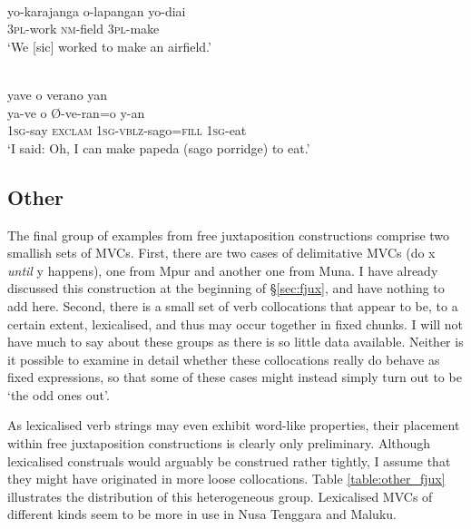 \ea \label{Tobelo_16}
\\
\gll yo-karajanga o-lapangan yo-diai \\
3\textsc{pl}-work \textsc{nm}-field 3\textsc{pl}-make \\
\glft `We [sic] worked to make an airfield.' \\ 
\z

\ea \label{Dusner_4}
\\
\glll yave o verano yan \\
ya-ve o Ø-ve-ran=o y-an \\
1\textsc{sg}-say \textsc{exclam} 1\textsc{sg}-\textsc{vblz}-sago=\textsc{fill} 1\textsc{sg}-eat \\
\glft `I said: Oh, I can make papeda (sago porridge) to eat.'\\ 
\z

\subsection{Other}

The final group of examples from free juxtaposition constructions comprise two smallish sets of MVCs. First, there are two cases of delimitative MVCs (do x \textit{until} y happens), one from Mpur and another one from Muna. I have already discussed this construction at the beginning of §\ref{sec:fjux}, and have nothing to add here. Second, there is a small set of verb collocations that appear to be, to a certain extent, lexicalised, and thus may occur together in fixed chunks. I will not have much to say about these groups as there is so little data available. Neither is it possible to examine in detail whether these collocations really do behave as fixed expressions, so that some of these cases might instead simply turn out to be `the odd ones out'.

As lexicalised verb strings may even exhibit word-like properties, their placement within free juxtaposition constructions is clearly only preliminary. Although lexicalised construals would arguably be construed rather tightly, I assume that they might have originated in more loose collocations. Table \ref{table:other_fjux} illustrates the distribution of this heterogeneous group. Lexicalised MVCs of different kinds seem to be more in use in Nusa Tenggara and Maluku. 

